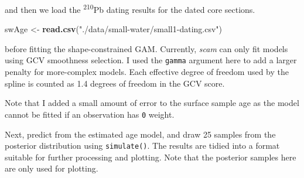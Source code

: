 \documentclass[12pt,]{article}
\newenvironment{Shaded}{\begin{snugshade}}{\end{snugshade}}
\newcommand{\KeywordTok}[1]{\textcolor[rgb]{0.13,0.29,0.53}{\textbf{{#1}}}}
\newcommand{\DataTypeTok}[1]{\textcolor[rgb]{0.13,0.29,0.53}{{#1}}}
\newcommand{\DecValTok}[1]{\textcolor[rgb]{0.00,0.00,0.81}{{#1}}}
\newcommand{\FloatTok}[1]{\textcolor[rgb]{0.00,0.00,0.81}{{#1}}}
\newcommand{\StringTok}[1]{\textcolor[rgb]{0.31,0.60,0.02}{{#1}}}
\newcommand{\NormalTok}[1]{{#1}}
\begin{document}
and then we load the \textsuperscript{210}Pb dating results for the
dated core sections.

\begin{Shaded}
\begin{Highlighting}[]
\NormalTok{swAge <-}\StringTok{ }\KeywordTok{read.csv}\NormalTok{(}\StringTok{"./data/small-water/small1-dating.csv"}\NormalTok{)}
\end{Highlighting}
\end{Shaded}

before fitting the shape-constrained GAM. Currently, \emph{scam} can
only fit models using GCV smoothness selection. I used the
\texttt{gamma} argument here to add a larger penalty for more-complex
models. Each effective degree of freedom used by the spline is counted
as 1.4 degrees of freedom in the GCV score.

\begin{Shaded}
\end{Shaded}

Note that I added a small amount of error to the surface sample age as
the model cannot be fitted if an observation has \texttt{0} weight.

Next, predict from the estimated age model, and draw 25 samples from the
posterior distribution using \texttt{simulate()}. The results are tidied
into a format suitable for further processing and plotting. Note that
the posterior samples here are only used for plotting.
\end{document}
